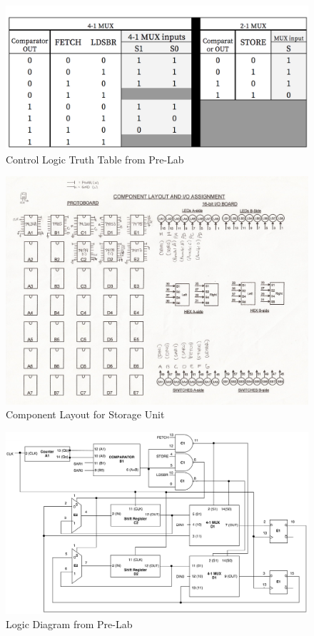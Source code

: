 \documentclass[journal, twocolumn, final,11pt,letterpaper]{IEEEtran}
\begin{document}
\begin{figure}[h]
	\centering
	\includegraphics[scale=0.75]{Control_Logic_Truth_Table.png}
	\caption{Control Logic Truth Table from Pre-Lab}
	\label{fig:truth-table-control}
\end{figure}

\begin{figure}[h]
	\centering
	\includegraphics[scale=0.19]{Component_Layout.jpeg}
	\caption{Component Layout for Storage Unit}
	\label{fig:component-layout}
\end{figure}

\begin{figure}[h]
	\centering
	\includegraphics[scale=0.43]{Logic_Diagram.png}
	\caption{Logic Diagram from Pre-Lab}
	\label{fig:logic-diagram}
\end{figure}
\end{document}
